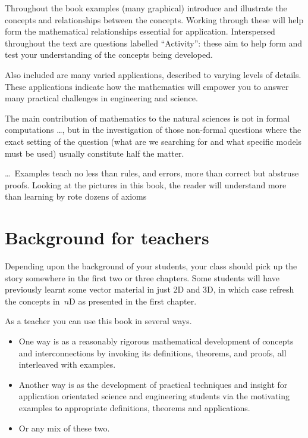 Throughout the book examples (many graphical) introduce and illustrate the concepts and relationships between the concepts.
Working through these will help form the mathematical relationships essential for application.
Interspersed throughout the text are questions labelled ``Activity'': these aim to help form and test your understanding of the concepts being developed.

Also included are many varied applications, described to varying levels of details.
These applications indicate how the mathematics will empower you to answer many practical challenges in engineering and science.


\begin{quoted}{\cite[p.xiii]{Arnold2014}}
The main contribution of mathematics to the natural sciences is not in formal computations \ldots, but in the investigation of those non-formal questions where the exact setting of the question (what are we searching for and what specific models must be used) usually constitute half the matter.

\ldots\
Examples teach no less than rules, and errors, more than correct but abstruse proofs.  
Looking at the pictures in this book, the reader will understand more than learning by rote dozens of axioms
\end{quoted}








\section*{Background for teachers}

Depending upon the background of your students, your class should pick up the story somewhere in the first two or three chapters.
Some students will have previously learnt some vector material in just 2D and 3D,  in which case refresh the concepts in~\(n\)D as presented in the first chapter.

As a teacher you can use this book in several ways.
\begin{itemize}
\item One way is as a reasonably rigorous mathematical development of concepts and interconnections by invoking its definitions, theorems, and proofs, all interleaved with examples.
\item Another way is as the development of practical techniques and insight for application orientated science and engineering students via the motivating examples to appropriate definitions, theorems and applications. 
\item Or any mix of these two.
\end{itemize}

